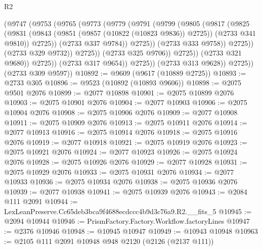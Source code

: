 \begin{lexlean}{R2}
\begin{coremodule}
                              (@9747
                                (@9753
                                  (@9765
                                    (@9773
                                      (@9779
                                        (@9791
                                          (@9799
                                            (@9805
                                              (@9817
                                                (@9825
                                                  (@9831
                                                    (@9843
                                                      (@9851 (@9857 (@10822 (@10823 @9836)) @2725))
                                                      (@2733 @341 @9810))
                                                    @2725))
                                                (@2733 @337 @9784))
                                              @2725))
                                          (@2733 @333 @9758))
                                        @2725))
                                    (@2733 @329 @9732))
                                  @2725))
                              (@2733 @325 @9706))
                            @2725))
                        (@2733 @321 @9680))
                      @2725))
                  (@2733 @317 @9654))
                @2725))
            (@2733 @313 @9628))
          @2725))
      (@2733 @309 @9597))
@10892 := @9609 (@9617 (@10889 @2725))
@10893 := @2733 @305
@10896 := @9523 (@10892 (@10893 @9606))
@10898 := @2075 @9501 @2076
@10899 := @2077 @10898
@10901 := @2075 @10899 @2076
@10903 := @2075 @10901 @2076
@10904 := @2077 @10903
@10906 := @2075 @10904 @2076
@10908 := @2075 @10906 @2076
@10909 := @2077 @10908
@10911 := @2075 @10909 @2076
@10913 := @2075 @10911 @2076
@10914 := @2077 @10913
@10916 := @2075 @10914 @2076
@10918 := @2075 @10916 @2076
@10919 := @2077 @10918
@10921 := @2075 @10919 @2076
@10923 := @2075 @10921 @2076
@10924 := @2077 @10923
@10926 := @2075 @10924 @2076
@10928 := @2075 @10926 @2076
@10929 := @2077 @10928
@10931 := @2075 @10929 @2076
@10933 := @2075 @10931 @2076
@10934 := @2077 @10933
@10936 := @2075 @10934 @2076
@10938 := @2075 @10936 @2076
@10939 := @2077 @10938
@10941 := @2075 @10939 @2076
@10943 := @2084 @111 @2091
@10944 := LexLeanPreserve.Cc65deb3bca9f4688ecdccc4b9d3c76a9.R2.__fits_5
@10945 := @2094 @10944
@10946 := PrismFactory.Factory.Workflow.factoryLines
@10947 := @2376 @10946
@10948 := @10945 @10947
@10949 := @10943 @10948
@10963 := @2105
    @111
    @2091
    @10948
    @948
    @2120
    (@2126 (@2137 @111))

\end{coremodule}
\end{lexlean}
